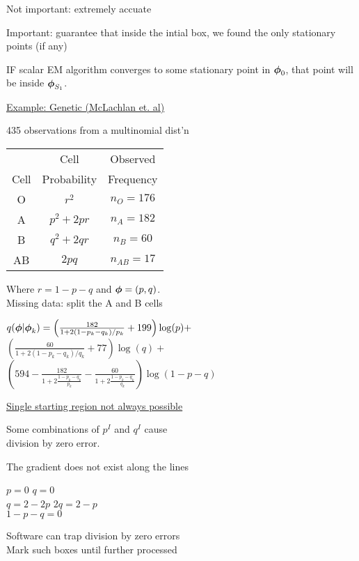 \documentclass{slides}
\begin{document}
\begin{note}
Not important: extremely accuate

Important: guarantee that inside the intial box, we found the only
stationary points (if any)

IF scalar EM algorithm converges to some stationary point in
$\mbox{\boldmath $\phi$}_0$, that point will be inside $\mbox{\boldmath $\phi$}_{S_1}$.

\end{note}
\begin{slide}
\begin{center}
\underline{Example: Genetic (McLachlan et. al)}
\end{center}

435 observations from a multinomial dist'n
\renewcommand{\arraystretch}{1.50}
\begin{center}
\begin{tabular}{ccc}
&     Cell         &  Observed \\
Cell & Probability & Frequency \\ \hline
O  & $r^2$ & $n_O = 176$ \\
A  & $p^2 + 2pr$ & $n_A = 182$ \\
B  & $q^2 + 2qr$ & $n_B = 60$ \\
AB & $2pq$ & $n_{AB} = 17$ \\
\end{tabular}
\end{center}
\renewcommand{\arraystretch}{1.0}

Where $r= 1-p-q$ and $\mbox{\boldmath $\phi$} = (p,q)$.\\
Missing data: split the A and B cells 

$q(\mbox{\boldmath $\phi$}|\mbox{\boldmath $\phi$}_k) = \left(\frac{182}{1+2(1-p_k-q_k)/p_k} + 199\right) \log(p) +$\\
$\left(\frac{60}{1+2(1-p_k-q_k)/q_k} + 77\right) \log(q) +$ \\
$\left( 594 - \frac{182}{1+2\frac{1-p_k-q_k}{p_k}} -
\frac{60}{1+2\frac{1-p_k-q_k}{q_k}}\right) \log(1-p-q)
$
\es
\bs
\begin{center}
\underline{Single starting region not always possible}
\end{center}

Some combinations of $p^I$ and $q^I$ cause \\
division by zero error.  

The gradient does not exist along the lines 
\begin{center}
$p=0$ \quad $q=0$\\
$q=2-2p$ \quad $2q=2-p$\\
$1-p-q=0$
\end{center}
Software can trap division by zero errors\\
Mark such boxes until further processed


\end{slide}
\end{document}
